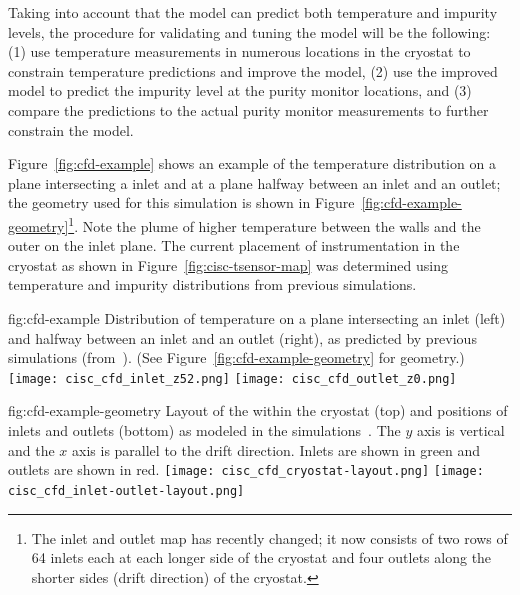 Taking into account that the  model can predict both temperature and impurity levels, the procedure for validating and tuning the  model will be the following: (1) use temperature measurements in numerous locations in the cryostat to constrain temperature predictions and  improve the  model, (2) use the improved model  to predict the \lar impurity level at the purity monitor locations, and (3) compare the predictions to the actual  purity monitor measurements to further constrain the  model.  

Figure~\ref{fig:cfd-example} shows an example of the temperature
distribution on a plane intersecting a  inlet and at a
plane halfway between an inlet and an outlet; 
the geometry used for
this simulation is shown in Figure~\ref{fig:cfd-example-geometry}\footnote{The inlet and outlet map has recently changed; it now consists of two rows of 64 inlets each at each longer side of the cryostat and four outlets along the shorter sides (drift direction) of the cryostat.}. Note the plume of higher temperature  between the walls and
the outer  on the inlet plane. The current placement of instrumentation in
the cryostat as shown in Figure~\ref{fig:cisc-tsensor-map} was determined using temperature and impurity distributions from previous simulations.

\begin{dunefigure}{fig:cfd-example}
  {Distribution of temperature on a plane intersecting an inlet (left) and halfway between an inlet and an outlet (right), as predicted by previous  simulations (from~\cite{bib:docdb5915}). (See Figure~\ref{fig:cfd-example-geometry} for geometry.)}
  \texttt{[image: cisc\_cfd\_inlet\_z52.png]}
  \texttt{[image: cisc\_cfd\_outlet\_z0.png]}
\end{dunefigure}

\begin{dunefigure}{fig:cfd-example-geometry}
  {Layout of the  within the cryostat (top) and positions of  inlets and outlets (bottom) as modeled in the  simulations~\cite{bib:docdb5915}. The $y$ axis is vertical and the $x$ axis is parallel to the  drift direction. Inlets are shown in green and outlets are shown in red.}
  \texttt{[image: cisc\_cfd\_cryostat-layout.png]}
  \texttt{[image: cisc\_cfd\_inlet-outlet-layout.png]}
\end{dunefigure}

